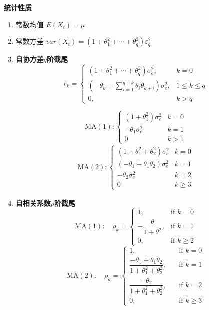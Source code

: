 \documentclass{article} %
\begin{document}
\textbf{统计性质}
\begin{enumerate}
\item {常数均值}
\(
E(X_t)=\mu
\)

\item {常数方差}
\(
var(X_t)=(1+\theta_1^2+\cdots+\theta_q^2)\varepsilon_q^2
\)

\item \textbf{自协方差$q$阶截尾}
\[
r_{k}=\begin{cases}
(1+\theta_{1}^{2}+\cdots+\theta_{q}^{2})\sigma_e^{2},&k=0\\
(-\theta_{k}+\sum_{i=1}^{q-k}\theta_{i}\theta_{k+i})\sigma_e^{2},&1\leq k\leq q\\
0,&k>q
\end{cases}
\]

\[
\text{MA}(1):\begin{cases}
(1+\theta_1^2)\sigma_e^2&k=0\\
-\theta_1\sigma_e^2&k=1\\
0&k>1
\end{cases}
\]
\[
\begin{aligned}
  \text{MA}(2):\begin{cases}
(1+\theta_{1}^{2}+\theta_2^2)\sigma_e^{2}&k=0\\
(-\theta_{1}+\theta_{1}\theta_{2})\sigma_e^{2}&k=1\\
-\theta_{2}\sigma_e^{2}&k=2\\
0&k\geq3
\end{cases}
\end{aligned}
\]

\item \textbf{自相关系数$p$阶截尾}
\[
  \text{MA}(1):\quad\rho_k=\left\{\begin{array}{ll}
1,&\text{if }k=0\\
-\dfrac{\theta}{1+\theta^2},&\text{if }k=1\\
0,&\text{if }k\ge2
\end{array}\right.
\]
\[
  \text{MA}(2):\quad \left.\rho_k=\left\{\begin{array}{ll}
1,&\quad\text{if }k=0\\
\dfrac{-\theta_1+\theta_1\theta_2}{1+\theta_1^2+\theta_2^2},&\quad\text{if }k=1\\
\dfrac{-\theta_2}{1+\theta_1^2+\theta_2^2},&\quad\text{if }k=2\\
0,&\quad\text{if }k\geq3
\end{array}\right.\right.
\]

\end{enumerate}
\end{document}
